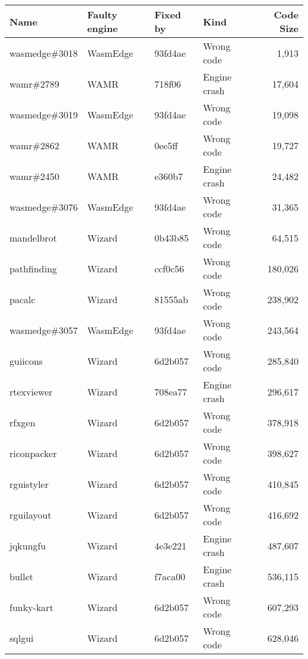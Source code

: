 \begin{tabular}{llllr}
\hline
 Name            & Faulty engine   & Fixed by   & Kind         &   Code Size \\
\hline
 wasmedge\#3018   & WasmEdge        & 93fd4ae    & Wrong code   &       1,913 \\
 wamr\#2789       & WAMR            & 718f06     & Engine crash &      17,604 \\
 wasmedge\#3019   & WasmEdge        & 93fd4ae    & Wrong code   &      19,098 \\
 wamr\#2862       & WAMR            & 0ee5ff     & Wrong code   &      19,727 \\
 wamr\#2450       & WAMR            & e360b7     & Engine crash &      24,482 \\
 wasmedge\#3076   & WasmEdge        & 93fd4ae    & Wrong code   &      31,365 \\
 mandelbrot      & Wizard          & 0b43b85    & Wrong code   &      64,515 \\
 pathfinding     & Wizard          & ccf0c56    & Wrong code   &     180,026 \\
 pacalc          & Wizard          & 81555ab    & Wrong code   &     238,902 \\
 wasmedge\#3057   & WasmEdge        & 93fd4ae    & Wrong code   &     243,564 \\
 guiicons        & Wizard          & 6d2b057    & Wrong code   &     285,840 \\
 rtexviewer      & Wizard          & 708ea77    & Engine crash &     296,617 \\
 rfxgen          & Wizard          & 6d2b057    & Wrong code   &     378,918 \\
 riconpacker     & Wizard          & 6d2b057    & Wrong code   &     398,627 \\
 rguistyler      & Wizard          & 6d2b057    & Wrong code   &     410,845 \\
 rguilayout      & Wizard          & 6d2b057    & Wrong code   &     416,692 \\
 jqkungfu        & Wizard          & 4e3e221    & Engine crash &     487,607 \\
 bullet          & Wizard          & f7aca00    & Engine crash &     536,115 \\
 funky-kart      & Wizard          & 6d2b057    & Wrong code   &     607,293 \\
 sqlgui          & Wizard          & 6d2b057    & Wrong code   &     628,046 \\

\end{tabular}
